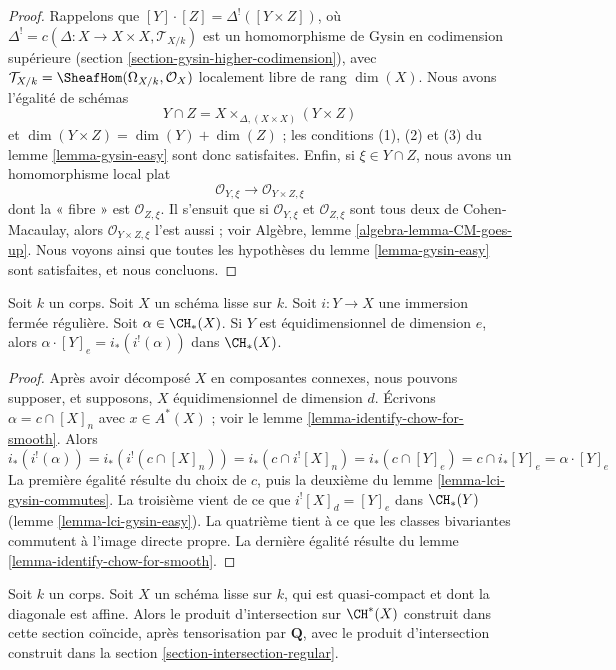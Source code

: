 \begin{proof}
Rappelons que $[Y] \cdot [Z] = \Delta^!([Y \times Z])$, où
$\Delta^! = c(\Delta : X \to X \times X, \mathcal{T}_{X/k})$
est un homomorphisme de Gysin en codimension supérieure
(section \ref{section-gysin-higher-codimension}), avec
$\mathcal{T}_{X/k} = \SheafHom(\Omega_{X/k}, \mathcal{O}_X)$
localement libre de rang $\dim(X)$. Nous avons l'égalité de schémas
$$
Y \cap Z = X \times_{\Delta, (X \times X)} (Y \times Z)
$$
et $\dim(Y \times Z) = \dim(Y) + \dim(Z)$ ; les conditions 
(1), (2) et (3) du lemme \ref{lemma-gysin-easy} sont donc satisfaites.
Enfin, si $\xi \in Y \cap Z$, nous avons un homomorphisme local
plat
$$
\mathcal{O}_{Y, \xi} \longrightarrow
\mathcal{O}_{Y \times Z, \xi}
$$
dont la « fibre » est $\mathcal{O}_{Z, \xi}$. Il s'ensuit que si
$\mathcal{O}_{Y, \xi}$ et $\mathcal{O}_{Z, \xi}$
sont tous deux de Cohen-Macaulay, alors $\mathcal{O}_{Y \times Z, \xi}$ l'est aussi ; voir
Algèbre, lemme \ref{algebra-lemma-CM-goes-up}.
Nous voyons ainsi que toutes les hypothèses du
lemme \ref{lemma-gysin-easy} sont satisfaites, et nous concluons.
\end{proof}

\begin{lemma}
\label{lemma-intersect-regularly-embedded}
Soit $k$ un corps. Soit $X$ un schéma lisse sur $k$. Soit $i : Y \to X$
une immersion fermée régulière. Soit $\alpha \in \CH_*(X)$. Si $Y$ est
équidimensionnel de dimension $e$, alors
$\alpha \cdot [Y]_e = i_*(i^!(\alpha))$ dans $\CH_*(X)$.
\end{lemma}

\begin{proof}
Après avoir décomposé $X$ en composantes connexes, nous pouvons supposer, et supposons, $X$
équidimensionnel de dimension $d$. Écrivons $\alpha = c \cap [X]_n$
avec $x \in A^*(X)$ ; voir le lemme \ref{lemma-identify-chow-for-smooth}. Alors
$$
i_*(i^!(\alpha)) = i_*(i^!(c \cap [X]_n)) =
i_*(c \cap i^![X]_n) = i_*(c \cap [Y]_e) =
c \cap i_*[Y]_e = \alpha \cdot [Y]_e
$$
La première égalité résulte du choix de $c$, puis la deuxième du
lemme \ref{lemma-lci-gysin-commutes}. La troisième vient de ce que
$i^![X]_d = [Y]_e$ dans $\CH_*(Y)$ (lemme \ref{lemma-lci-gysin-easy}).
La quatrième tient à ce que les classes bivariantes commutent à l'image directe propre.
La dernière égalité résulte du lemme \ref{lemma-identify-chow-for-smooth}.
\end{proof}

\begin{lemma}
\label{lemma-intersection-regular-smooth}
Soit $k$ un corps. Soit $X$ un schéma lisse sur $k$, qui est
quasi-compact et dont la diagonale est affine. Alors le produit
d'intersection sur $\CH^*(X)$ construit dans cette section coïncide,
après tensorisation par $\mathbf{Q}$, avec le produit d'intersection
construit dans la section \ref{section-intersection-regular}.
\end{lemma}

